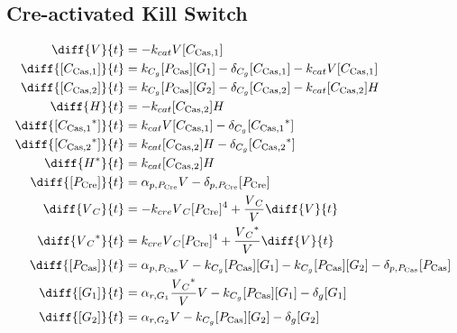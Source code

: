 \subsection{Cre-activated Kill Switch}
\label{s:Cre_delayed_kill_switch}

\begin{align}
\diff{\vectorGen{}}{t} & = - \casCutRate{{}}\vectorGen{}\conc{\cplx{\cas}{1}}\\
\diff{\conc{\cplx{\cas}{1}}}{t} & =  \gRnaBind{}\conc{\proSp{\cas{}}}\conc{\gRna{1}} - \casCompDegradeRate{}\conc{\cplx{\cas}{1}} - \casCutRate{{}}\vectorGen{}\conc{\cplx{\cas}{1}}\\
\diff{\conc{\cplx{\cas}{2}}}{t} & =  \gRnaBind{}\conc{\proSp{\cas{}}}\conc{\gRna{2}} - \casCompDegradeRate{}\conc{\cplx{\cas}{2}} - \casCutRate{{}}\conc{\cplx{\cas}{2}}\hostGen{}\\
\diff{\hostGen{}}{t} & = - \casCutRate{{}}\conc{\cplx{\cas}{2}}\hostGen{}\\
\diff{\conc{\bound{\cplx{\cas}{1}}}}{t} & =  \casCutRate{{}}\vectorGen{}\conc{\cplx{\cas}{1}} - \casCompDegradeRate{}\conc{\bound{\cplx{\cas}{1}}}\\
\diff{\conc{\bound{\cplx{\cas}{2}}}}{t} & =  \casCutRate{{}}\conc{\cplx{\cas}{2}}\hostGen{} - \casCompDegradeRate{}\conc{\bound{\cplx{\cas}{2}}}\\
\diff{\edited{\hostGen{}}}{t} & =  \casCutRate{{}}\conc{\cplx{\cas}{2}}\hostGen{}\\
\diff{\conc{\proSp{\cre{}}}}{t} & =  \txtlRate{\proSp{\cre{}}}\vectorGen{} - \proDegradeRate{\proSp{\cre{}}}\conc{\proSp{\cre{}}}\\
\diff{\vectorGen{}_C}{t} & = - \creCutRate{} \vectorGen{}_C \conc{\proSp{\cre{}}}^4 + \frac{\vectorGen{}_C}{\vectorGen{}} \diff{\vectorGen{}}{t}\\
\diff{\edited{\vectorGen{}_C}}{t} & =  \creCutRate{} \vectorGen{}_C \conc{\proSp{\cre{}}}^4 + \frac{\edited{\vectorGen{}_C}}{\vectorGen{}} \diff{\vectorGen{}}{t}\\
\diff{\conc{\proSp{\cas{}}}}{t} & =  \txtlRate{\proSp{\cas{}}}\vectorGen{} - \gRnaBind{}\conc{\proSp{\cas{}}}\conc{\gRna{1}} - \gRnaBind{}\conc{\proSp{\cas{}}}\conc{\gRna{2}} - \proDegradeRate{\proSp{\cas{}}}\conc{\proSp{\cas{}}}\\
\diff{\conc{\gRna{1}}}{t} & =  \txRate{\gRna{1}}\frac{\edited{\vectorGen{}_C}}{\vectorGen{}}\vectorGen{} - \gRnaBind{}\conc{\proSp{\cas{}}}\conc{\gRna{1}} - \rnaDegradeRate{}\conc{\gRna{1}}\\
\diff{\conc{\gRna{2}}}{t} & =  \txRate{\gRna{2}}\vectorGen{} - \gRnaBind{}\conc{\proSp{\cas{}}}\conc{\gRna{2}} - \rnaDegradeRate{}\conc{\gRna{2}}
\end{align}

